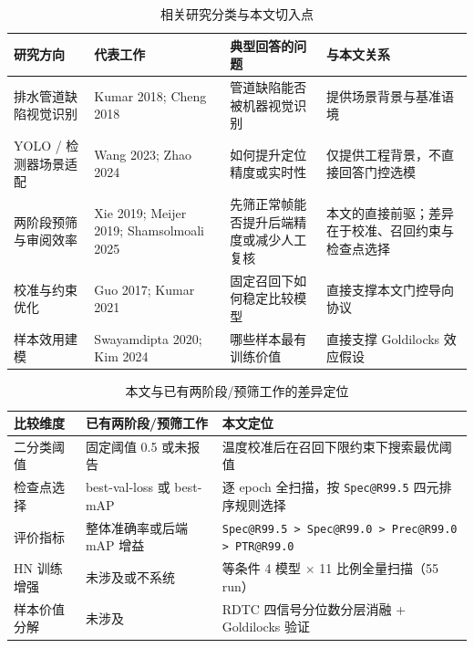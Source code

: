 \documentclass[UTF8,openany,12pt]{ctexbook}
\newcommand{\formalmetric}[1]{\texttt{#1}}
\begin{document}
\begin{table}[H]
    \centering
    \caption{相关研究分类与本文切入点}
    \label{tab:related-work-map}
    \begin{tabularx}{\textwidth}{p{3.1cm}p{3.1cm}Xp{2.3cm}}
        \toprule
        研究方向 & 代表工作 & 典型回答的问题 & 与本文关系 \\
        \midrule
        排水管道缺陷视觉识别 & Kumar 2018; Cheng 2018 & 管道缺陷能否被机器视觉识别 & 提供场景背景与基准语境 \\
        YOLO / 检测器场景适配 & Wang 2023; Zhao 2024 & 如何提升定位精度或实时性 & 仅提供工程背景，不直接回答门控选模 \\
        两阶段预筛与审阅效率 & Xie 2019; Meijer 2019; Shamsolmoali 2025 & 先筛正常帧能否提升后端精度或减少人工复核 & 本文的直接前驱；差异在于校准、召回约束与检查点选择 \\
        校准与约束优化 & Guo 2017; Kumar 2021 & 固定召回下如何稳定比较模型 & 直接支撑本文门控导向协议 \\
        样本效用建模 & Swayamdipta 2020; Kim 2024 & 哪些样本最有训练价值 & 直接支撑 Goldilocks 效应假设 \\
        \bottomrule
    \end{tabularx}
\end{table}

\begin{table}[H]
    \centering
    \caption{本文与已有两阶段/预筛工作的差异定位}
    \label{tab:thesis-difference-positioning}
    \begin{tabularx}{\textwidth}{p{2.6cm}XX}
        \toprule
        比较维度 & 已有两阶段/预筛工作 & 本文定位 \\
        \midrule
        二分类阈值 & 固定阈值 0.5 或未报告 & 温度校准后在召回下限约束下搜索最优阈值 \\
        检查点选择 & best-val-loss 或 best-mAP & 逐 epoch 全扫描，按 \formalmetric{Spec@R99.5} 四元排序规则选择 \\
        评价指标 & 整体准确率或后端 mAP 增益 & \formalmetric{Spec@R99.5 > Spec@R99.0 > Prec@R99.0 > PTR@R99.0} \\
        HN 训练增强 & 未涉及或不系统 & 等条件 4 模型 $\times$ 11 比例全量扫描（55 run） \\
        样本价值分解 & 未涉及 & RDTC 四信号分位数分层消融 + Goldilocks 验证 \\
        \bottomrule
    \end{tabularx}
\end{table}
\end{document}
